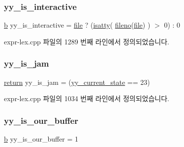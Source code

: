 \subsubsection{\texorpdfstring{yy\+\_\+is\+\_\+interactive}{yy\_is\_interactive}}
{\footnotesize\ttfamily \mbox{\hyperlink{expr-lex_8cpp_a91b64995742fd30063314f12340b4b5a}{b}} yy\+\_\+is\+\_\+interactive = \mbox{\hyperlink{expr-lex_8cpp_a702945180aa732857b380a007a7e2a21}{file}} ? (\mbox{\hyperlink{expr-lex_8cpp_aef88e7abfad3a0a8812ec4a04ea1de6b}{isatty}}( \mbox{\hyperlink{expr-lex_8cpp_a2c12e4b6615ac6838a99d5b6fa619683}{fileno}}(\mbox{\hyperlink{expr-lex_8cpp_a702945180aa732857b380a007a7e2a21}{file}}) ) $>$ 0) \+: 0}



expr-\/lex.\+cpp 파일의 1289 번째 라인에서 정의되었습니다.

\mbox{\label{expr-lex_8cpp_a7494532160b510aa4e49743e9be97259}} 
\subsubsection{\texorpdfstring{yy\+\_\+is\+\_\+jam}{yy\_is\_jam}}
{\footnotesize\ttfamily \mbox{\hyperlink{gb_codes_c_b_8h_a9717e7bbecb906637e86cef6da3d83c2}{return}} yy\+\_\+is\+\_\+jam = (\mbox{\hyperlink{expr-lex_8cpp_abb8b9672f94e21056888ae611b41cd1b}{yy\+\_\+current\+\_\+state}} == 23)}



expr-\/lex.\+cpp 파일의 1034 번째 라인에서 정의되었습니다.

\mbox{\label{expr-lex_8cpp_a725031cce2e48e1e5c7f713146ed73bc}} 
\subsubsection{\texorpdfstring{yy\+\_\+is\+\_\+our\+\_\+buffer}{yy\_is\_our\_buffer}}
{\footnotesize\ttfamily \mbox{\hyperlink{expr-lex_8cpp_a91b64995742fd30063314f12340b4b5a}{b}} yy\+\_\+is\+\_\+our\+\_\+buffer = 1}



